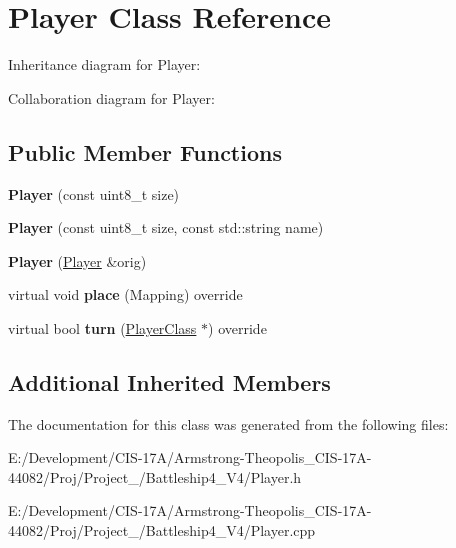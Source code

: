 \hypertarget{class_player}{}\section{Player Class Reference}
\label{class_player}


Inheritance diagram for Player\+:


Collaboration diagram for Player\+:
\subsection*{Public Member Functions}
\begin{DoxyCompactItemize}
\item 
\mbox{\label{class_player_a87229c604cf4ffc0d9e3b4dab38c8e17}} 
{\bfseries Player} (const uint8\+\_\+t size)
\item 
\mbox{\label{class_player_a6f03bb9aa1bbff2fce057724ae640fd5}} 
{\bfseries Player} (const uint8\+\_\+t size, const std\+::string name)
\item 
\mbox{\label{class_player_af14d533923f3497c47a4cf930178e090}} 
{\bfseries Player} (\mbox{\hyperlink{class_player}{Player}} \&orig)
\item 
\mbox{\label{class_player_ad7707554e3dc42c23b95bc50db1b00b7}} 
virtual void {\bfseries place} (Mapping) override
\item 
\mbox{\label{class_player_a6996f8d1615ece361f04e6523cec2e61}} 
virtual bool {\bfseries turn} (\mbox{\hyperlink{class_player_class}{Player\+Class}} $\ast$) override
\end{DoxyCompactItemize}
\subsection*{Additional Inherited Members}


The documentation for this class was generated from the following files\+:\begin{DoxyCompactItemize}
\item 
E\+:/\+Development/\+C\+I\+S-\/17\+A/\+Armstrong-\/\+Theopolis\+\_\+\+C\+I\+S-\/17\+A-\/44082/\+Proj/\+Project\+\_/\+Battleship4\+\_\+\+V4/Player.\+h\item 
E\+:/\+Development/\+C\+I\+S-\/17\+A/\+Armstrong-\/\+Theopolis\+\_\+\+C\+I\+S-\/17\+A-\/44082/\+Proj/\+Project\+\_/\+Battleship4\+\_\+\+V4/Player.\+cpp\end{DoxyCompactItemize}
